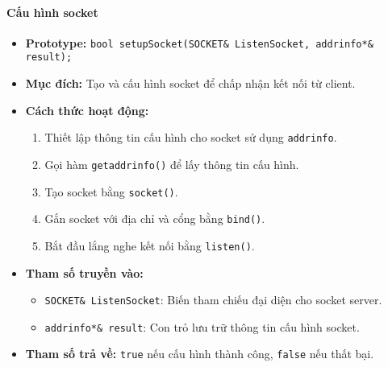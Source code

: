 \paragraph{\textbf{Cấu hình socket}}
\begin{itemize}
    \item \textbf{Prototype:} \texttt{bool setupSocket(SOCKET\& ListenSocket, addrinfo*\& result);}
    
    \item \textbf{Mục đích:} Tạo và cấu hình socket để chấp nhận kết nối từ client.
    
    \item \textbf{Cách thức hoạt động:} 
    \begin{enumerate}
        \item Thiết lập thông tin cấu hình cho socket sử dụng \texttt{addrinfo}.
        \item Gọi hàm \texttt{getaddrinfo()} để lấy thông tin cấu hình.
        \item Tạo socket bằng \texttt{socket()}.
        \item Gắn socket với địa chỉ và cổng bằng \texttt{bind()}.
        \item Bắt đầu lắng nghe kết nối bằng \texttt{listen()}.
    \end{enumerate}
    
    \item \textbf{Tham số truyền vào:} 
    \begin{itemize}
        \item \texttt{SOCKET\& ListenSocket}: Biến tham chiếu đại diện cho socket server.
        \item \texttt{addrinfo*\& result}: Con trỏ lưu trữ thông tin cấu hình socket.
    \end{itemize}
    
    \item \textbf{Tham số trả về:} \texttt{true} nếu cấu hình thành công, \texttt{false} nếu thất bại.
\end{itemize}

